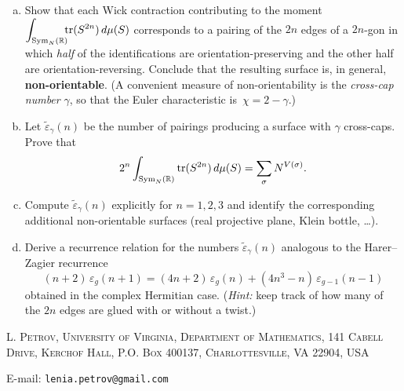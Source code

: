 \documentclass[letterpaper,11pt,oneside,reqno]{article}
\numberwithin{equation}{section}
\theoremstyle{definition}
\begin{document}
\begin{enumerate}[(a)]
  \item
  Show that each Wick contraction contributing to the moment
  $\displaystyle\int_{\operatorname{Sym}_{N}(\Bbb R)}\!\!\!\operatorname{tr}(S^{2n})\,d\mu(S)$
  corresponds to a pairing of the $2n$ edges of a $2n$-gon in which
  \emph{half} of the identifications are orientation-preserving and the
  other half are orientation-reversing.  Conclude that the resulting
  surface is, in general, \textbf{non-orientable}.
  (A convenient measure of non-orientability is the \emph{cross-cap number}
  $\gamma$, so that the Euler characteristic is $\,\chi=2-\gamma$.)

  \item
  Let $\tilde\varepsilon_\gamma(n)$ be the number of pairings producing a
  surface with $\gamma$ cross-caps.
  Prove that
  \[
    2^n\int_{\operatorname{Sym}_{N}(\Bbb R)}\operatorname{tr}(S^{2n})\,d\mu(S)
		=
		\sum_{\sigma}N^{V(\sigma)}.
  \]

  \item
  Compute $\tilde\varepsilon_\gamma(n)$ explicitly for $n=1,2,3$
  and identify the corresponding additional non-orientable surfaces
  (real projective plane, Klein bottle, \dots).

  \item
  Derive a recurrence relation for the numbers $\tilde\varepsilon_\gamma(n)$
  analogous to the Harer–Zagier recurrence
  \[
    (n+2)\,\varepsilon_g(n+1)
    =(4n+2)\,\varepsilon_g(n)
      +(4n^{3}-n)\,\varepsilon_{g-1}(n-1)
  \]
  obtained in the complex Hermitian case.  (\emph{Hint:} keep track of how
  many of the $2n$ edges are glued with or without a twist.)
\end{enumerate}








\medskip

\textsc{L. Petrov, University of Virginia, Department of Mathematics, 141 Cabell Drive, Kerchof Hall, P.O. Box 400137, Charlottesville, VA 22904, USA}

E-mail: \texttt{lenia.petrov@gmail.com}
\end{document}
